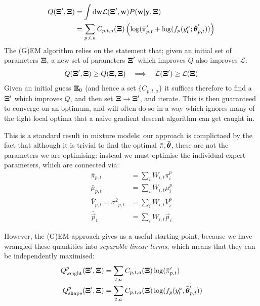 	\begin{equation}
		\begin{split}
			Q(\mathbf{\boldsymbol{\mathrm{\Xi}}}^\prime, \mathbf{\boldsymbol{\mathrm{\Xi}}}) & = \int \mathrm d \mathbf{\boldsymbol{\mathrm{w}}} \mathcal{L}(\mathbf{\boldsymbol{\mathrm{\Xi}}}^\prime, \mathbf{\boldsymbol{\mathrm{w}}}) P(\mathbf{\boldsymbol{\mathrm{w}}} | \mathbf{\boldsymbol{\mathrm{y}}}, \mathbf{\boldsymbol{\mathrm{\Xi}}})
			\\
			                     & = \sum_{p,t,a} C_{p,t,a}(\mathbf{\boldsymbol{\mathrm{\Xi}}}) \left(\log(\bar{\pi}_{p,t}^\prime + \log(f_{p}(y_t^a; \bar{\mathbf{\boldsymbol{\mathrm{\theta}}}}_{p,t}^\prime))\right)
		\end{split}
	\end{equation}
	The (G)EM algorithm relies on the statement that; given an initial set of parameters $\mathbf{\boldsymbol{\mathrm{\Xi}}}$, a new set of parameters $\mathbf{\boldsymbol{\mathrm{\Xi}}}^\prime$ which improves $Q$ also improves $\mathcal{L}$:
	\begin{equation}
		Q(\mathbf{\boldsymbol{\mathrm{\Xi}}}^\prime, \mathbf{\boldsymbol{\mathrm{\Xi}}}) \geq Q(\mathbf{\boldsymbol{\mathrm{\Xi}}}, \mathbf{\boldsymbol{\mathrm{\Xi}}}) \quad \Longrightarrow \quad \mathcal{L}(\mathbf{\boldsymbol{\mathrm{\Xi}}}^\prime) \geq \mathcal{L}(\mathbf{\boldsymbol{\mathrm{\Xi}}})
	\end{equation}
	Given an initial guess $\mathbf{\boldsymbol{\mathrm{\Xi}}}_0$ (and hence a set $\{C_{p,t,a}\}$ it suffices therefore to find a $\mathbf{\boldsymbol{\mathrm{\Xi}}}^\prime$ which improves $Q$, and then set $\mathbf{\boldsymbol{\mathrm{\Xi}}} \to \mathbf{\boldsymbol{\mathrm{\Xi}}}^\prime$, and iterate. This is then guaranteed to converge on an optimum, and will often do so in a way which ignores many of the tight local optima that a naive gradient descent algorithm can get caught in.

	This is a standard result in mixture models: our approach is complictaed by the fact that although it is trivial to find the optimal $\bar{\pi}, \bar{\mathbf{\boldsymbol{\mathrm{\theta}}}}$, these are not the parameters we are optimising: instead we must optimise the individual expert parameters, which are connected via:
	\begin{equation}
		\begin{split}
			\bar{\pi}_{p,t}                        & = \sum_i W_{i,t} \pi_i^p
			\\
			\bar{\mu}_{p,t}                        & = \sum_i W_{i,t} \mu_i^p
			\\
			\bar{V}_{p,t}   = \bar{\sigma^2}_{p,t} & = \sum_i W_{i,t} V_i^p
			\\
			\bar{\vec{p}}_t                        & = \sum_i W_{i,t} \vec{p}_i
		\end{split}
	\end{equation}

	However, the (G)EM approach gives us a useful starting point, because we have wrangled these quantities into \textit{separable linear terms}, which means that they can be independently maximised:
	\begin{equation}
		\begin{split}
			Q^{p}_\text{weight}(\mathbf{\boldsymbol{\mathrm{\Xi}}}^\prime, \mathbf{\boldsymbol{\mathrm{\Xi}}}) & = \sum_{t,a}  C_{p,t,a}(\mathbf{\boldsymbol{\mathrm{\Xi}}}) \log(\bar{\pi}^\prime_{p,t})
			\\
			Q^{p}_\text{shape}(\mathbf{\boldsymbol{\mathrm{\Xi}}}^\prime, \mathbf{\boldsymbol{\mathrm{\Xi}}})  & = \sum_{t,a} C_{p,t,a}(\mathbf{\boldsymbol{\mathrm{\Xi}}}) \log({f}_{p}(y_t^a, \bar{\mathbf{\boldsymbol{\mathrm{\theta}}}}_{p,t}^\prime))
		\end{split}
	\end{equation}

